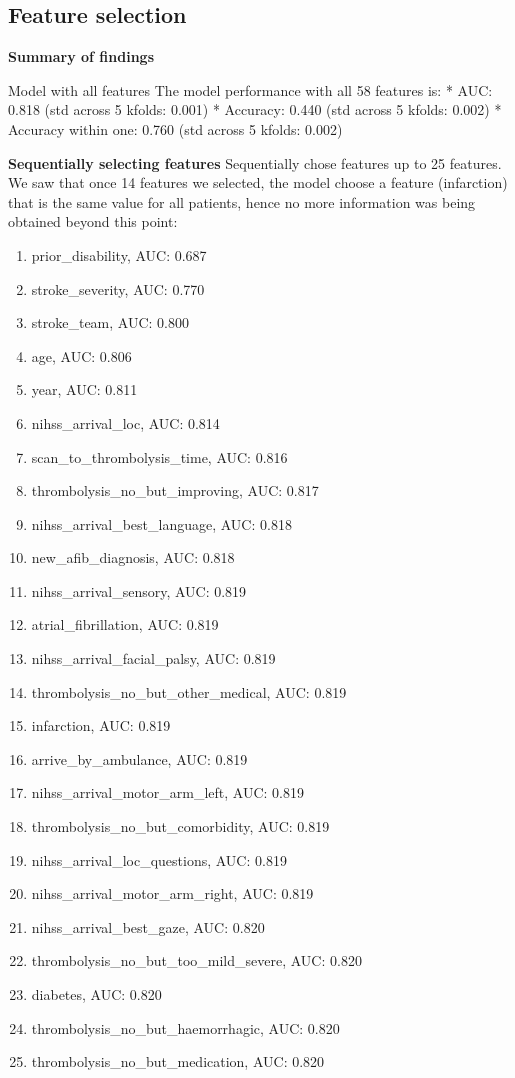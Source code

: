 \subsection{Feature selection}

\textbf{Summary of findings}

Model with all features
The model performance with all 58 features is:
* AUC: 0.818 (std across 5 kfolds: 0.001)
* Accuracy: 0.440 (std across 5 kfolds: 0.002)
* Accuracy within one: 0.760 (std across 5 kfolds: 0.002)

\textbf{Sequentially selecting features}
Sequentially chose features up to 25 features. We saw that once 14 features we selected, the model choose a feature (infarction) that is the same value for all patients, hence no more information was being obtained beyond this point:

\begin{enumerate}
    \item prior\_disability, AUC: 0.687
    \item stroke\_severity, AUC: 0.770
    \item stroke\_team, AUC: 0.800
    \item age, AUC: 0.806
    \item  year, AUC: 0.811
    \item nihss\_arrival\_loc, AUC: 0.814
    \item scan\_to\_thrombolysis\_time, AUC: 0.816
    \item thrombolysis\_no\_but\_improving, AUC: 0.817
    \item nihss\_arrival\_best\_language, AUC: 0.818
    \item new\_afib\_diagnosis, AUC: 0.818
    \item nihss\_arrival\_sensory, AUC: 0.819
    \item atrial\_fibrillation, AUC: 0.819
    \item nihss\_arrival\_facial\_palsy, AUC: 0.819
    \item thrombolysis\_no\_but\_other\_medical, AUC: 0.819
    \item infarction, AUC: 0.819
    \item arrive\_by\_ambulance, AUC: 0.819
    \item nihss\_arrival\_motor\_arm\_left, AUC: 0.819
    \item thrombolysis\_no\_but\_comorbidity, AUC: 0.819
    \item nihss\_arrival\_loc\_questions, AUC: 0.819
    \item nihss\_arrival\_motor\_arm\_right, AUC: 0.819
    \item nihss\_arrival\_best\_gaze, AUC: 0.820
    \item thrombolysis\_no\_but\_too\_mild\_severe, AUC: 0.820
    \item diabetes, AUC: 0.820
    \item thrombolysis\_no\_but\_haemorrhagic, AUC: 0.820
    \item thrombolysis\_no\_but\_medication, AUC: 0.820
\end{enumerate}

